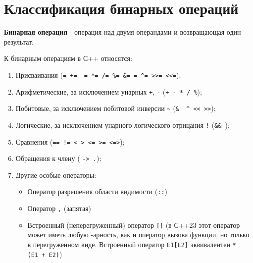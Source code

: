 \section{Классификация бинарных операций}

\textbf{Бинарная операция} - операция над двумя операндами и
возвращающая один результат.

К бинарным операциям в С++ относятся:

\begin{enumerate}
\def\labelenumi{\arabic{enumi})}
\item
  Присваивания
  (\texttt{=\ +=\ -=\ *=\ /=\ \%=\ \&=\ \textbar{}=\ \^{}=\ \textgreater{}\textgreater{}=\ \textless{}\textless{}=});
\item
  Арифметические, за исключением унарных \texttt{+}, \texttt{-}
  (\texttt{+\ -\ *\ /\ \%});
\item
  Побитовые, за исключением побитовой инверсии
  \texttt{\textasciitilde{}}
  (\texttt{\&\ \textbar{}\ \^{}\ \textless{}\textless{}\ \textgreater{}\textgreater{}});
\item
  Логические, за исключением унарного логического отрицания \texttt{!}
  (\texttt{\&\&\ \textbar{}\textbar{}});
\item
  Сравнения
  (\texttt{==\ !=\ \textless{}\ \textgreater{}\ \textless{}=\ \textgreater{}=\ \textless{}=\textgreater{}});
\item
  Обращения к члену ( \texttt{-\textgreater{}\ .});
\item
  Другие особые операторы:

  \begin{itemize}
  \item
    Оператор разрешения области видимости (\texttt{::})
  \item
    Оператор \texttt{,} (запятая)
  \item
    Встроенный (неперегруженный) оператор \texttt{{[}{]}} (в С++23 этот
    оператор может иметь любую -арность, как и оператор вызова функции,
    но только в перегруженном виде. Встроенный оператор
    \texttt{E1{[}E2{]}} эквивалентен \texttt{*(E1\ +\ E2)})
  \end{itemize}
\end{enumerate}
